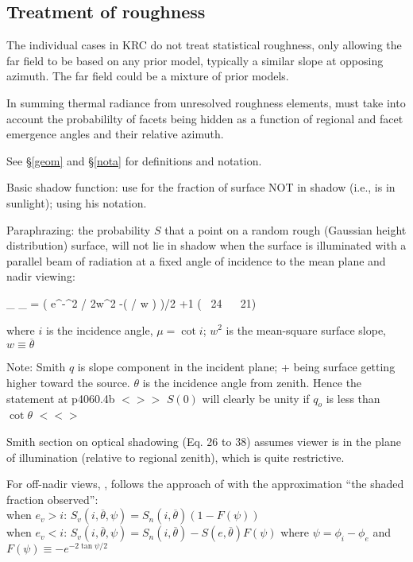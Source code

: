 \documentclass{article}
\newcommand{\erfc}{\mathrm{erfc}}  %
\newcommand{\qeq}{\hspace{25.mm}} %
\newcommand{\bq}{$ < \! > \!   \! >$ } %
\newcommand{\eq}{ $< \! \! < \! > $ } %
\begin{document}
\pagebreak
\subsection{Treatment of roughness}  %

The individual cases in KRC do not treat statistical roughness, only allowing
the far field to be based on any prior model, typically a similar slope at
opposing azimuth. The far field could be a mixture of prior models.

In summing thermal radiance from unresolved roughness elements, must take into
account the probabililty of facets being hidden as a function of regional and
facet emergence angles and their relative azimuth.

 See \S \ref{geom} and \S \ref{nota} for definitions and notation.

Basic shadow function: use  for the fraction of surface NOT in 
shadow (i.e., is in sunlight); using his notation. %

Paraphrazing: the probability $S$ that a point on a random rough (Gaussian height
distribution) surface, will not lie in shadow when the surface is illuminated
with a parallel beam of radiation at a fixed angle of incidence to the mean
plane and nadir viewing:

\qbn {}_{} \Leftarrow  {}_{} = \frac{ 1- \frac{1}{2} \erfc \left( \mu / \sqrt{2} w \right) } 
{\left(  \cdot {}
e^{-\mu^2 / 2w^2} -\erfc \left(  \mu /  w \right) \right)/2  +1 } \qeq ( \ 24 \  \ 21) \qen

where $i$ is the incidence angle, $\mu = \cot i $; $w^2$ is the mean-square
surface slope, $w \equiv \overline{\theta} $

Note: Smith $q$ is slope component in the incident plane; + being surface
getting higher toward the source. $\theta$ is the incidence angle from
zenith. Hence the statement at p4060.4b \bq $S(0)$ will clearly be unity if
$q_o$ is less than $\cot \theta$ \eq

Smith section on optical shadowing (Eq. 26 to 38) assumes viewer is in the plane
of illumination (relative to regional zenith), which is quite restrictive.

  For off-nadir views,  , follows the approach of  with the approximation ``the shaded fraction observed'':
\\ when $e_v>i$: $S_v(i,\overline{\theta},\psi)=S_n(i,\overline{\theta}) \left( 1-F(\psi) \right) $
\\ when $e_v<i$: $S_v(i,\overline{\theta},\psi)=S_n(i,\overline{\theta}) -S(e,\overline{\theta})F(\psi) $
\qi  where $\psi = \phi_i-\phi_e$  and $F(\psi) \equiv -e^{-2 \tan \psi/2} $
\end{document}
